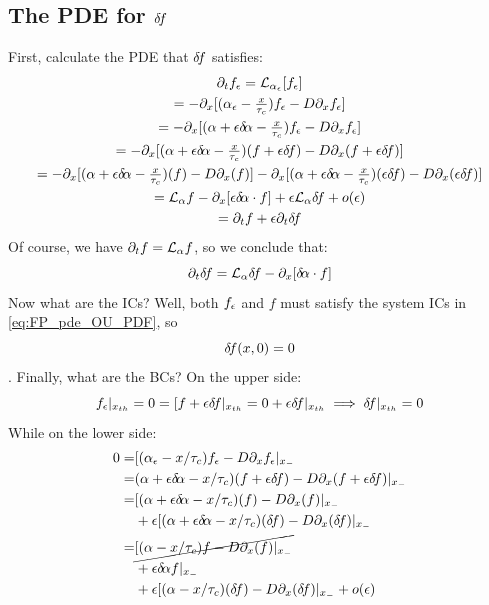 \documentclass{article}
\begin{document}
\subsection{The PDE for ${ \delta\! f}$}
First, calculate the PDE that ${ \delta\! f}$ satisfies:
\begin{multline}
\di_t f_\e =  \L_{\a_\e} [f_\e]
\\
= -\di_x [ (\a_\e - \tfrac{x}\tc) f_\e  - D \di_x f_\e]
\\
=  -\di_x [ (\a + \e\da - \tfrac{x}\tc) f_\e  - D \di_x f_\e]
\\
=  -\di_x [ (\a + \e\da - \tfrac{x}\tc) (f + \e \df)  - D \di_x (f + \e \df)]
\\
=  -\di_x [ (\a + \e\da - \tfrac{x}\tc) (f)  - D \di_x (f)]
- \di_x [ (\a + \e\da - \tfrac{x}\tc) (\e \df)  - D \di_x (\e \df)]
\\
= \L_\a f  -\di_x [ \e\da\cdot  f]
  +\e \L_\a \df + o(\e) 
\\
= \di_t f + \e \di_t \df
\end{multline}
Of course, we have ${\partial}_t f = { \mathcal{L} }_{\alpha} f$, so we conclude that:
\begin{equation}
{\partial}_t { \delta\! f} = { \mathcal{L} }_{\alpha} { \delta\! f} -{\partial}_x [{ \delta\! {\alpha}} \cdot f] 
\end{equation}
Now what are the ICs? Well, both $f_{\epsilon}$ and $f$ must satisfy the system ICs in
\cref{eq:FP_pde_OU_PDF}, so $${ \delta\! f} (x,0) = 0$$.
Finally, what are the BCs?
On the upper side:
$$
f_{\epsilon} |_{ x_{th} } = 0 = [ f  + {\epsilon} { \delta\! f} |_{ x_{th} } = 0 + {\epsilon} { \delta\! f}|_{ x_{th} } \implies { \delta\! f} |_{ x_{th} } =
0 $$
While on the lower side:
\begin{align*}
0 =& [ (\a_\e - x/\tc)f_\e - D \di_x f_\e |_\xmin
\\
=& (\a +\e \da - x/\tc)(f + \e \df ) - D \di_x (f + \e \df) |_\xmin
\\
=& [(\a +\e \da - x/\tc)(f) - D \di_x (f) |_\xmin
\\
& + \e [ (\a +\e \da - x/\tc)(\df) - D \di_x (\df) |_\xmin
\\
=& \cancel{[(\a - x/\tc)f - D \di_x (f) |_\xmin}
\\
&+ \e \da f|_\xmin
\\
&+ \e [ (\a - x/\tc)(\df) - D \di_x (\df) |_\xmin   + o(\e)
\end{align*}
 
\end{document}
